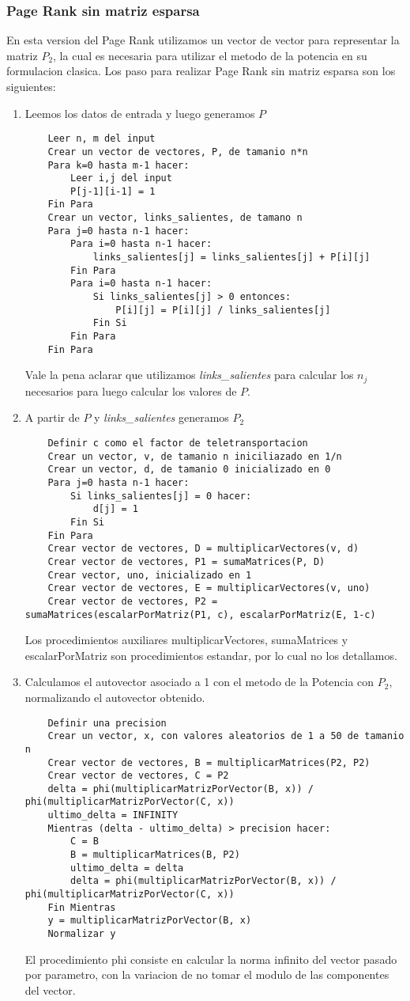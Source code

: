\subsubsection{Page Rank sin matriz esparsa}
En esta version del Page Rank utilizamos un vector de vector para representar la matriz $P_2$, la cual es necesaria para utilizar el metodo de la potencia en su formulacion clasica.
Los paso para realizar Page Rank sin matriz esparsa son los siguientes:
\begin{enumerate}
	\item Leemos los datos de entrada y luego generamos $P$
	\begin{lstlisting}
	Leer n, m del input
	Crear un vector de vectores, P, de tamanio n*n
	Para k=0 hasta m-1 hacer:
		Leer i,j del input
		P[j-1][i-1] = 1
	Fin Para
	Crear un vector, links_salientes, de tamano n
	Para j=0 hasta n-1 hacer:
		Para i=0 hasta n-1 hacer:
			links_salientes[j] = links_salientes[j] + P[i][j]
		Fin Para
		Para i=0 hasta n-1 hacer:
			Si links_salientes[j] > 0 entonces:
				P[i][j] = P[i][j] / links_salientes[j]
			Fin Si
		Fin Para
	Fin Para
	\end{lstlisting}
	Vale la pena aclarar que utilizamos \textit{links_salientes} para calcular los $n_j$ necesarios para luego calcular los valores de $P$.
	\item A partir de $P$ y \textit{links_salientes} generamos $P_2$
	\begin{lstlisting}
	Definir c como el factor de teletransportacion
	Crear un vector, v, de tamanio n iniciliazado en 1/n
	Crear un vector, d, de tamanio 0 inicializado en 0
	Para j=0 hasta n-1 hacer:
		Si links_salientes[j] = 0 hacer:
			d[j] = 1
		Fin Si
	Fin Para
	Crear vector de vectores, D = multiplicarVectores(v, d)
	Crear vector de vectores, P1 = sumaMatrices(P, D)
	Crear vector, uno, inicializado en 1
	Crear vector de vectores, E = multiplicarVectores(v, uno)
	Crear vector de vectores, P2 = sumaMatrices(escalarPorMatriz(P1, c), escalarPorMatriz(E, 1-c)
	\end{lstlisting}
	Los procedimientos auxiliares multiplicarVectores, sumaMatrices y escalarPorMatriz son procedimientos estandar, por lo cual no los detallamos.
	\item Calculamos el autovector asociado a 1 con el metodo de la Potencia con $P_2$, normalizando el autovector obtenido.
	\begin{lstlisting}
	Definir una precision
	Crear un vector, x, con valores aleatorios de 1 a 50 de tamanio n
	Crear vector de vectores, B = multiplicarMatrices(P2, P2)
	Crear vector de vectores, C = P2
	delta = phi(multiplicarMatrizPorVector(B, x)) / phi(multiplicarMatrizPorVector(C, x))
	ultimo_delta = INFINITY
	Mientras (delta - ultimo_delta) > precision hacer:
		C = B
		B = multiplicarMatrices(B, P2)
		ultimo_delta = delta
		delta = phi(multiplicarMatrizPorVector(B, x)) / phi(multiplicarMatrizPorVector(C, x))
	Fin Mientras
	y = multiplicarMatrizPorVector(B, x)
	Normalizar y
	\end{lstlisting}
	El procedimiento phi consiste en calcular la norma infinito del vector pasado por parametro, con la variacion de no tomar el modulo de las componentes del vector.


\end{enumerate}
